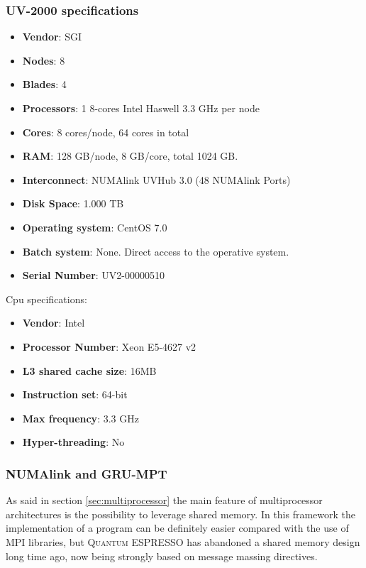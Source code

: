 \documentclass[a4paper,12pt]{article}
\newcommand\QE{\textsc{Quantum} ESPRESSO }
\begin{document}
\subsubsection{UV-2000 specifications}

\begin{itemize}
\item \textbf{Vendor}: SGI
\item \textbf{Nodes}: 8
\item \textbf{Blades}: 4
\item \textbf{Processors}: 1 8-cores Intel Haswell 3.3 GHz per node
\item \textbf{Cores}: 8 cores/node, 64 cores in total
\item \textbf{RAM}: 128 GB/node, 8 GB/core, total 1024 GB.
\item \textbf{Interconnect}: NUMAlink UVHub 3.0 (48 NUMAlink Ports)
\item \textbf{Disk Space}: 1.000 TB
\item \textbf{Operating system}: CentOS 7.0
\item \textbf{Batch system}: None. Direct access to the operative system.
\item \textbf{Serial Number}: UV2-00000510
\end{itemize}

Cpu specifications:

\begin{itemize}
\item \textbf{Vendor}: Intel
\item \textbf{Processor Number}: Xeon E5-4627 v2
\item \textbf{L3 shared cache size}: 16MB
\item \textbf{Instruction set}: 64-bit
\item \textbf{Max frequency}: 3.3 GHz
\item \textbf{Hyper-threading}: No 
\end{itemize}


\subsubsection{NUMAlink and GRU-MPT}
As said in section \ref{sec:multiprocessor} the main feature of multiprocessor architectures is the possibility to leverage shared memory.
In this framework the implementation of a program can be definitely easier compared with the use of MPI libraries, but \QE has abandoned a shared memory design long time ago, now being strongly based on message massing directives.
\end{document}
